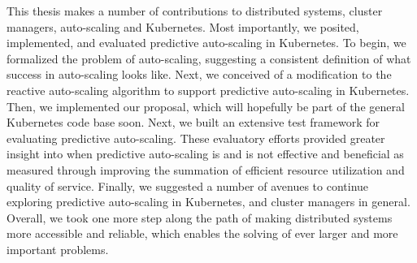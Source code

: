 This thesis makes a number of contributions to distributed systems, cluster
managers, auto-scaling and Kubernetes. Most importantly, we posited,
implemented, and evaluated predictive auto-scaling in Kubernetes. To begin, we
formalized the problem of auto-scaling, suggesting a consistent definition of
what success in auto-scaling looks like. Next, we conceived of a
modification to the reactive auto-scaling
algorithm to support predictive auto-scaling in Kubernetes. Then, we implemented
our proposal, which will hopefully be part of the general Kubernetes code base
soon. Next, we built an extensive test framework for evaluating predictive
auto-scaling. These evaluatory efforts provided greater insight into
when predictive auto-scaling is and is not
effective and beneficial as measured through improving the summation of
efficient resource utilization and quality of service.
Finally, we suggested a number of avenues to
continue exploring predictive auto-scaling in Kubernetes, and cluster managers
in general. Overall, we took one more step along the path of making distributed
systems more accessible and reliable, which enables the solving of ever larger
and more important problems.
